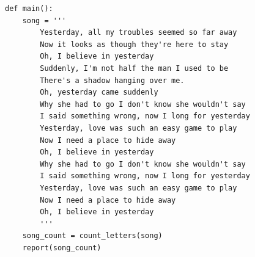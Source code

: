 \documentclass{article}
\begin{document}
\begin{lstlisting}
def main():
    song = '''
        Yesterday, all my troubles seemed so far away
        Now it looks as though they're here to stay
        Oh, I believe in yesterday
        Suddenly, I'm not half the man I used to be
        There's a shadow hanging over me.
        Oh, yesterday came suddenly
        Why she had to go I don't know she wouldn't say
        I said something wrong, now I long for yesterday
        Yesterday, love was such an easy game to play
        Now I need a place to hide away
        Oh, I believe in yesterday
        Why she had to go I don't know she wouldn't say
        I said something wrong, now I long for yesterday
        Yesterday, love was such an easy game to play
        Now I need a place to hide away
        Oh, I believe in yesterday
        '''
    song_count = count_letters(song)
    report(song_count)
\end{lstlisting}
\end{document}
